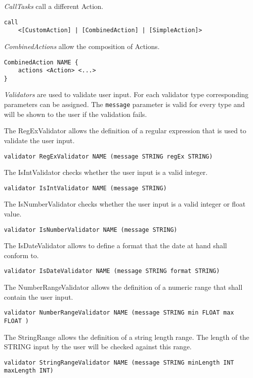 \textit{CallTasks} call a different Action.
\begin{lstlisting}
call
	<[CustomAction] | [CombinedAction] | [SimpleAction]>
\end{lstlisting}

\textit{CombinedActions} allow the composition of Actions.
\begin{lstlisting}
CombinedAction NAME {
	actions <Action> <...>
}
\end{lstlisting}

\textit{Validators} are used to validate user input. For each validator type corresponding parameters can be assigned. The \lstinline!message! parameter is valid for every type and will be shown to the user if the validation fails.

The RegExValidator allows the definition of a regular expression that is used to validate the user input.
\begin{lstlisting}
validator RegExValidator NAME (message STRING regEx STRING)
\end{lstlisting}

The IsIntValidator checks whether the user input is a valid integer.
\begin{lstlisting}
validator IsIntValidator NAME (message STRING)
\end{lstlisting}

The IsNumberValidator checks whether the user input is a valid integer or float value.
\begin{lstlisting}
validator IsNumberValidator NAME (message STRING)
\end{lstlisting}

The IsDateValidator allows to define a format that the date at hand shall conform to.
\begin{lstlisting}
validator IsDateValidator NAME (message STRING format STRING)
\end{lstlisting}

The NumberRangeValidator allows the definition of a numeric range that shall contain the user input.
\begin{lstlisting}
validator NumberRangeValidator NAME (message STRING min FLOAT max FLOAT )
\end{lstlisting}

The StringRange allows the definition of a string length range. The length of the STRING input by the user will be checked against this range.
\begin{lstlisting}
validator StringRangeValidator NAME (message STRING minLength INT maxLength INT)
\end{lstlisting}

